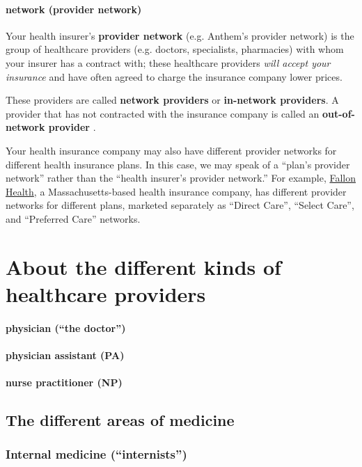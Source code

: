 \documentclass{article}
\begin{document}
\paragraph{network (provider network)} Your health insurer's {\bf provider network} (e.g. Anthem's provider network) is the group of healthcare providers (e.g. doctors, specialists, pharmacies) with whom your insurer has a contract with; these healthcare providers {\it will accept your insurance} and have often agreed to charge the insurance company lower prices.

These providers are called {\bf network providers} or {\bf in-network providers}. A provider that has not contracted with the insurance company is called an {\bf out-of-network provider} \cite{provider-networks}.

Your health insurance company may also have different provider networks for different health insurance plans. In this case, we may speak of a ``plan's provider network'' rather than the ``health insurer's provider network.'' For example, \href{https://www.fchp.org/}{Fallon Health}, a Massachusetts-based health insurance company, has different provider networks for different plans, marketed separately as ``Direct Care'', ``Select Care'', and ``Preferred Care'' networks.

\section{About the different kinds of healthcare providers}

\paragraph{physician (``the doctor'')}

\paragraph{physician assistant (PA)}

\paragraph{nurse practitioner (NP)}

\subsection{The different areas of medicine}

\subsubsection{Internal medicine (``internists'')}
\end{document}
